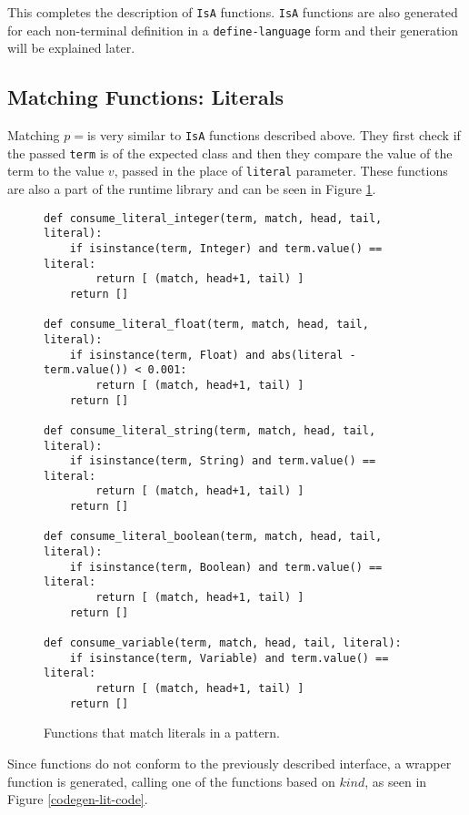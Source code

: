 This completes the description of \texttt{IsA} functions. \texttt{IsA} functions are also generated for each non-terminal definition in a \texttt{define-language} form and their generation will be explained later.

\subsection{Matching Functions: Literals}
Matching $p=$\space \LiteralPattern \space is very similar to \texttt{IsA} functions described above. They first check if the passed \texttt{term} is of the expected class and then they compare the value of the term to the value $v$, passed in the place of \texttt{literal} parameter. These functions are also a part of the runtime library and can be seen in Figure \ref{codegen-pat-literal}.

\begin{figure}[ht]
\begin{verbatim}
def consume_literal_integer(term, match, head, tail, literal):
    if isinstance(term, Integer) and term.value() == literal:
        return [ (match, head+1, tail) ]
    return []

def consume_literal_float(term, match, head, tail, literal):
    if isinstance(term, Float) and abs(literal - term.value()) < 0.001:
        return [ (match, head+1, tail) ]
    return []

def consume_literal_string(term, match, head, tail, literal):
    if isinstance(term, String) and term.value() == literal:
        return [ (match, head+1, tail) ]
    return []

def consume_literal_boolean(term, match, head, tail, literal):
    if isinstance(term, Boolean) and term.value() == literal:
        return [ (match, head+1, tail) ]
    return []

def consume_variable(term, match, head, tail, literal):
    if isinstance(term, Variable) and term.value() == literal:
        return [ (match, head+1, tail) ]
    return []
\end{verbatim}
\caption{Functions that match literals in a pattern.}
\label{codegen-pat-literal}
\end{figure}

Since functions do not conform to the previously described interface, a wrapper function is generated, calling one of the functions based on $kind$, as seen in Figure \ref{codegen-lit-code}.

